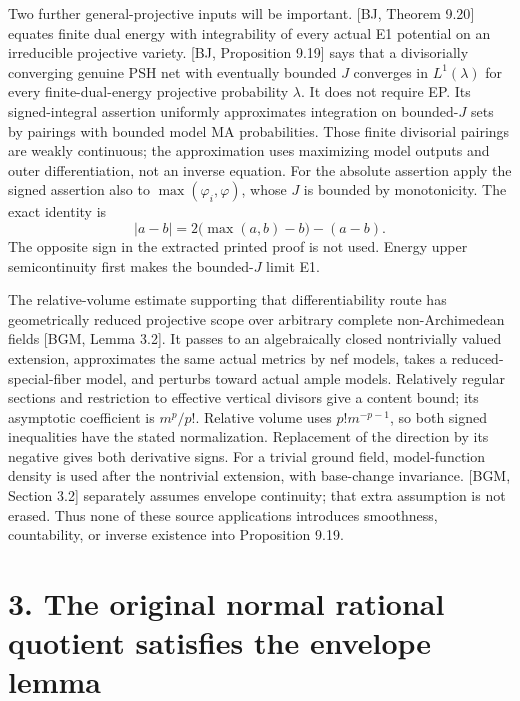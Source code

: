 \documentclass[
  10pt,
]{article}
\begin{document}
Two further general-projective inputs will be important. {[}BJ, Theorem
9.20{]} equates finite dual energy with integrability of every actual E1
potential on an irreducible projective variety. {[}BJ, Proposition
9.19{]} says that a divisorially converging genuine PSH net with
eventually bounded \(J\) converges in \(L^1(\lambda)\) for every
finite-dual-energy projective probability \(\lambda\). It does not
require EP. Its signed-integral assertion uniformly approximates
integration on bounded-\(J\) sets by pairings with bounded model MA
probabilities. Those finite divisorial pairings are weakly continuous;
the approximation uses maximizing model outputs and outer
differentiation, not an inverse equation. For the absolute assertion
apply the signed assertion also to \(\max(\varphi_i,\varphi)\), whose
\(J\) is bounded by monotonicity. The exact identity is \[
 |a-b|=2\bigl(\max(a,b)-b\bigr)-(a-b).                           \tag{2.3}
\] The opposite sign in the extracted printed proof is not used. Energy
upper semicontinuity first makes the bounded-\(J\) limit E1.

The relative-volume estimate supporting that differentiability route has
geometrically reduced projective scope over arbitrary complete
non-Archimedean fields {[}BGM, Lemma 3.2{]}. It passes to an
algebraically closed nontrivially valued extension, approximates the
same actual metrics by nef models, takes a reduced-special-fiber model,
and perturbs toward actual ample models. Relatively regular sections and
restriction to effective vertical divisors give a content bound; its
asymptotic coefficient is \(m^p/p!\). Relative volume uses
\(p!m^{-p-1}\), so both signed inequalities have the stated
normalization. Replacement of the direction by its negative gives both
derivative signs. For a trivial ground field, model-function density is
used after the nontrivial extension, with base-change invariance.
{[}BGM, Section 3.2{]} separately assumes envelope continuity; that
extra assumption is not erased. Thus none of these source applications
introduces smoothness, countability, or inverse existence into
Proposition 9.19.

\section{3. The original normal rational quotient satisfies the envelope
lemma}\label{the-original-normal-rational-quotient-satisfies-the-envelope-lemma}
\end{document}
